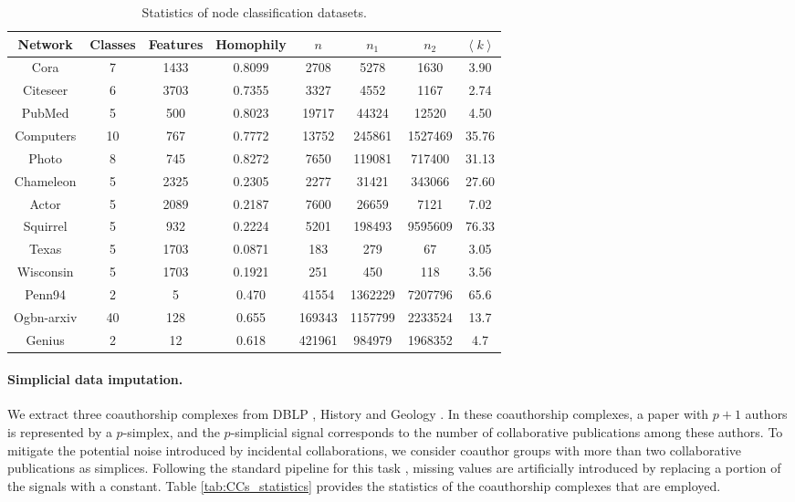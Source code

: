 \documentclass[letterpaper]{article} \usepackage{aaai24}
\theoremstyle{plain}
\theoremstyle{definition}
\theoremstyle{remark}
\begin{document}
\begin{table*}[htbp]
\centering
\begin{tabular}{cccccccc}
\toprule
Network   & Classes & Features & Homophily & $n $  & $n_1$  & $n_2$  &$\left \langle k \right \rangle$ \\
\midrule
Cora      & 7       & 1433     & 0.8099    & 2708  & 5278   & 1630      &3.90    \\
Citeseer  & 6       & 3703     & 0.7355    & 3327  & 4552   & 1167      &2.74\\
PubMed    & 5       & 500      & 0.8023    & 19717 & 44324  & 12520     &4.50\\
Computers & 10      & 767      & 0.7772    & 13752 & 245861 & 1527469   &35.76\\
Photo     & 8       & 745      & 0.8272    & 7650  & 119081 & 717400    &31.13\\
\midrule
Chameleon & 5       & 2325     & 0.2305    & 2277  & 31421  & 343066    &27.60\\
Actor     & 5       & 2089     & 0.2187    & 7600  & 26659  & 7121      &7.02\\
Squirrel  & 5       & 932      & 0.2224    & 5201  & 198493 & 9595609   &76.33\\
Texas     & 5       & 1703     & 0.0871    & 183   & 279    & 67        &3.05\\
Wisconsin & 5       & 1703     & 0.1921    & 251   & 450    & 118       &3.56\\
\midrule
Penn94    & 2       & 5        & 0.470     & 41554  & 1362229  & 7207796    &65.6\\
Ogbn-arxiv& 40       & 128        & 0.655     & 169343 & 1157799  & 2233524      &13.7\\
Genius  & 2       & 12        & 0.618     & 421961 & 984979  & 1968352   &4.7\\
\bottomrule
\end{tabular}
\caption{Statistics of node classification datasets.}
\label{tab:node_statistics}
\end{table*}



\paragraph{Simplicial data imputation.}
We extract three coauthorship complexes from DBLP \cite{data:DBLP-Benson2018}, History and Geology \cite{data:MAG-His-Geo}. In these coauthorship complexes, a paper with $p+1$ authors is represented by a $p$-simplex, and the $p$-simplicial signal corresponds to the number of collaborative publications among these authors. 
To mitigate the potential noise introduced by incidental collaborations, we consider coauthor groups with more than two  collaborative publications as simplices. 
Following the standard pipeline for this task \cite{SNN2020}, missing values are artificially introduced by replacing a portion of the signals with a constant.
Table \ref{tab:CCs_statistics} provides the statistics of the coauthorship complexes that are employed.
\end{document}
